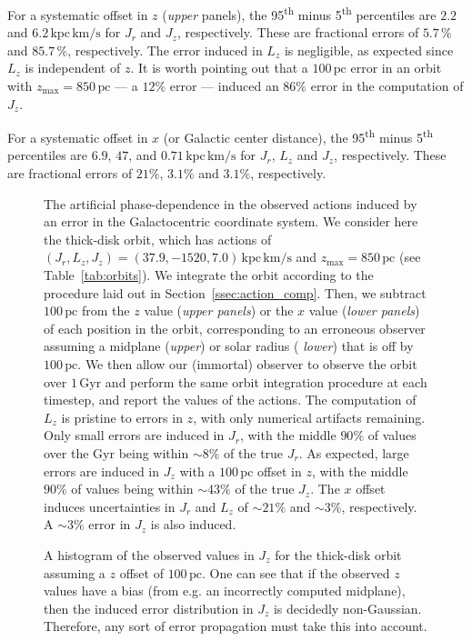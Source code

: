 \documentclass[twocolumn]{aastex62}
\newcommand{\pc}{\text{pc}}
\newcommand{\Gyr}{\text{Gyr}}
\newcommand{\kms}{\text{km}/\text{s}}
\newcommand{\actunit}{\text{kpc}\,\kms}
\begin{document}
For a systematic offset in $z$ ({\em upper} panels), the
95\textsuperscript{th} minus 5\textsuperscript{th} percentiles are $2.2$ and
$6.2\,\actunit$ for $J_r$ and $J_z$, respectively. These are fractional errors
of $5.7\,\%$ and $85.7\,\%$, respectively. The error induced in $L_z$ is
negligible, as expected since $L_z$ is independent of $z$. It is worth
pointing out that a $100\,\pc$ error in an orbit with
$z_{\text{max}}=850\,\pc$ --- a $12\%$ error
--- induced an $86\%$ error in the computation of $J_z$.

For a systematic offset in $x$ (or Galactic center distance), the
95\textsuperscript{th} minus 5\textsuperscript{th} percentiles are $6.9$,
$47$, and $0.71\,\actunit$ for $J_r$, $L_z$ and $J_z$, respectively. These are
fractional errors of $21\%$, $3.1\%$ and $3.1\%$, respectively.

\begin{figure}
\caption{The artificial phase-dependence in the observed actions induced by an
error in the Galactocentric coordinate system. We consider here the thick-disk
orbit, which has actions of $(J_r, L_z, J_z) = (37.9, -1520, 7.0)\,\actunit$
and $z_{\text{max}}=850\,\pc$ (see Table~\ref{tab:orbits}). We integrate the
orbit according to the procedure laid out in Section~\ref{ssec:action_comp}.
Then, we subtract $100\,\pc$ from the $z$ value ({\em upper panels}) or the
$x$ value ({\em lower panels}) of each position in the orbit, corresponding to
an erroneous observer assuming a midplane ({\em upper}) or solar radius ({\em
lower}) that is off by $100\,\pc$. We then allow our (immortal) observer to
observe the orbit over $1\,\Gyr$ and perform the same orbit integration
procedure at each timestep, and report the values of the actions. The
computation of $L_z$ is pristine to errors in $z$, with only numerical
artifacts remaining. Only small errors are induced in $J_r$, with the middle
$90\%$ of values over the $\Gyr$ being within $\sim8\%$ of the true $J_r$. As
expected, large errors are induced in $J_z$ with a $100\,\pc$ offset in $z$,
with the middle $90\%$ of values being within $\sim43\%$ of the true $J_z$.
The $x$ offset induces uncertainties in $J_r$ and $L_z$ of $\sim21\%$ and
$\sim3\%$, respectively. A $\sim3\%$ error in $J_z$ is also induced.}
\label{fig:one_orbit_wrong_ref}
\end{figure}

\begin{figure}
\caption{A histogram of the observed values in $J_z$ for the thick-disk orbit
assuming a $z$ offset of $100\,\pc$. One can see that if the observed $z$
values have a bias (from e.g. an incorrectly computed midplane), then the
induced error distribution in $J_z$ is decidedly non-Gaussian. Therefore, any
sort of error propagation must take this into account.}
\label{fig:Jz_hist}
\end{figure}
\end{document}

